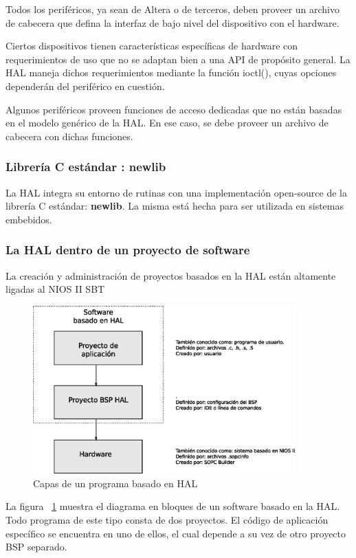 Todos los periféricos, ya sean de Altera o de terceros, deben proveer un archivo de cabecera que defina la interfaz de bajo nivel del dispositivo con el hardware. 

Ciertos dispositivos tienen características específicas de hardware con requerimientos de uso que no se adaptan bien a una API de propósito general. La HAL maneja dichos requerimientos mediante la función ioctl(), cuyas opciones dependerán del periférico en cuestión.

Algunos periféricos proveen funciones de acceso dedicadas que no están basadas en el modelo genérico de la HAL. En ese caso, se debe proveer un archivo de cabecera con dichas funciones.


\subsubsection*{Librería C estándar : newlib}
La HAL integra su entorno de rutinas con una implementación open-source de la librería C estándar:\textbf{ newlib}. La misma está hecha para ser utilizada en sistemas embebidos. 

\subsubsection*{La HAL dentro de un proyecto de software}
La creación y administración de proyectos basados en la HAL están altamente ligadas al NIOS II SBT

\begin{figure}[h]
  \centering
	\includegraphics[width=0.90\textwidth]{3-arquitectura/graf/halsof.eps}
  \caption{Capas de un programa basado en HAL}
  \label{fig:halsof}
\end{figure}

La figura ~\ref{fig:halsof} muestra el diagrama en bloques de un software basado en la HAL. Todo programa de este tipo consta de dos proyectos. El código de aplicación específico se encuentra en uno de ellos, el cual depende a su vez de otro proyecto BSP separado.

